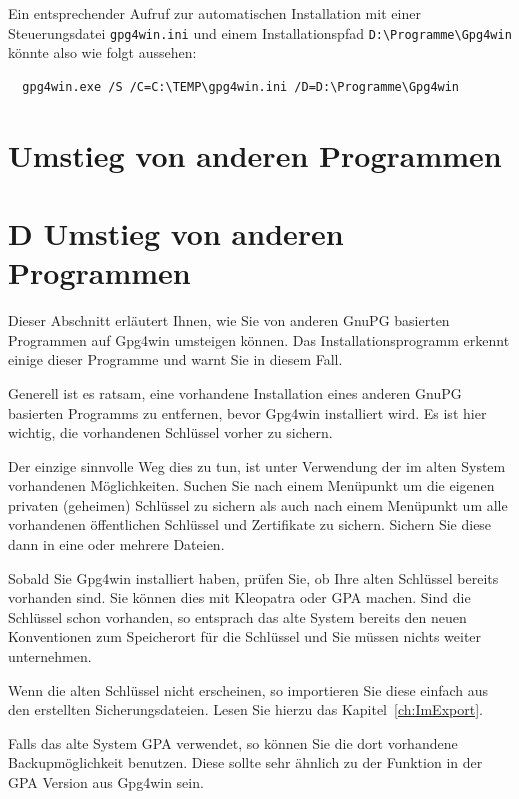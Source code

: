 \documentclass[a4paper,11pt, oneside,openright,titlepage,dvips]{scrbook}
\newcounter{chapter}
\begin{document}
Ein entsprechender Aufruf zur automatischen Installation mit einer
Steuerungsdatei \verb-gpg4win.ini- und einem Installationspfad
\verb-D:\Programme\Gpg4win- könnte also wie folgt aussehen:

\begin{verbatim}
  gpg4win.exe /S /C=C:\TEMP\gpg4win.ini /D=D:\Programme\Gpg4win
\end{verbatim}

\clearpage
{}
\T\chapter{Umstieg von anderen Programmen}
\W\chapter*{D Umstieg von anderen Programmen}
\label{ch:migration}

Dieser Abschnitt erläutert Ihnen, wie Sie von anderen GnuPG basierten
Programmen auf Gpg4win umsteigen können.  Das Installationsprogramm
erkennt einige dieser Programme und warnt Sie in diesem Fall.

Generell ist es ratsam, eine vorhandene Installation eines anderen
GnuPG basierten Programms zu entfernen, bevor Gpg4win installiert wird.
Es ist hier wichtig, die vorhandenen Schlüssel vorher zu sichern.

Der einzige sinnvolle Weg dies zu tun, ist unter Verwendung der im
alten System vorhandenen Möglichkeiten.  Suchen Sie nach einem
Menüpunkt um die eigenen privaten (geheimen) Schlüssel zu sichern als
auch nach einem Menüpunkt um alle vorhandenen öffentlichen Schlüssel
und Zertifikate zu sichern. Sichern Sie diese dann in eine oder
mehrere Dateien.

Sobald Sie Gpg4win installiert haben, prüfen Sie, ob Ihre
alten Schlüssel bereits vorhanden sind. Sie können dies mit Kleopatra
oder GPA machen. Sind die Schlüssel schon vorhanden, so entsprach das
alte System bereits den neuen Konventionen zum Speicherort für die
Schlüssel und Sie müssen nichts weiter unternehmen.

Wenn die alten Schlüssel nicht erscheinen, so importieren Sie diese
einfach aus den erstellten Sicherungsdateien. Lesen Sie hierzu das
Kapitel~\ref{ch:ImExport}.

Falls das alte System GPA verwendet, so können Sie die dort
vorhandene Backupmöglichkeit benutzen. Diese sollte sehr ähnlich zu
der Funktion in der GPA Version aus Gpg4win sein.
\end{document}
